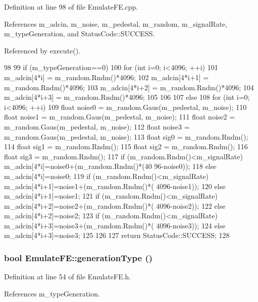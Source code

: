 Definition at line 98 of file EmulateFE.cpp.

References m\_\-adcin, m\_\-noise, m\_\-pedestal, m\_\-random, m\_\-signalRate, m\_\-typeGeneration, and StatusCode::SUCCESS.

Referenced by execute().


\begin{DoxyCode}
98                                       {
99   if (m_typeGeneration==0){
100     for (int i=0; i<4096; ++i){
101       m_adcin[4*i]   = m_random.Rndm()*4096;
102       m_adcin[4*i+1] = m_random.Rndm()*4096;
103       m_adcin[4*i+2] = m_random.Rndm()*4096;
104       m_adcin[4*i+3] = m_random.Rndm()*4096;
105     }
106   }
107   else {
108     for (int i=0; i<4096; ++i){
109       float noise0 = m_random.Gaus(m_pedestal, m_noise);
110       float noise1 = m_random.Gaus(m_pedestal, m_noise);
111       float noise2 = m_random.Gaus(m_pedestal, m_noise);
112       float noise3 = m_random.Gaus(m_pedestal, m_noise);
113       float sig0   = m_random.Rndm();
114       float sig1   = m_random.Rndm();
115       float sig2   = m_random.Rndm();
116       float sig3   = m_random.Rndm();
117       if (m_random.Rndm()<m_signalRate){ m_adcin[4*i]=noise0+(m_random.Rndm()*(40
      96-noise0)); }
118       else m_adcin[4*i]=noise0;
119       if (m_random.Rndm()<m_signalRate){ m_adcin[4*i+1]=noise1+(m_random.Rndm()*(
      4096-noise1)); }
120       else m_adcin[4*i+1]=noise1;
121       if (m_random.Rndm()<m_signalRate){ m_adcin[4*i+2]=noise2+(m_random.Rndm()*(
      4096-noise2)); }
122       else m_adcin[4*i+2]=noise2;
123       if (m_random.Rndm()<m_signalRate){ m_adcin[4*i+3]=noise3+(m_random.Rndm()*(
      4096-noise3)); }
124       else m_adcin[4*i+3]=noise3;
125     }    
126   }
127   return StatusCode::SUCCESS;
128 }
\end{DoxyCode}
\hypertarget{classEmulateFE_ad3aaa46fce2848cc9280e51a7e6fa572}{
\subsubsection[{generationType}]{\setlength{\rightskip}{0pt plus 5cm}bool EmulateFE::generationType ()}}
\label{classEmulateFE_ad3aaa46fce2848cc9280e51a7e6fa572}


Definition at line 54 of file EmulateFE.h.

References m\_\-typeGeneration.


